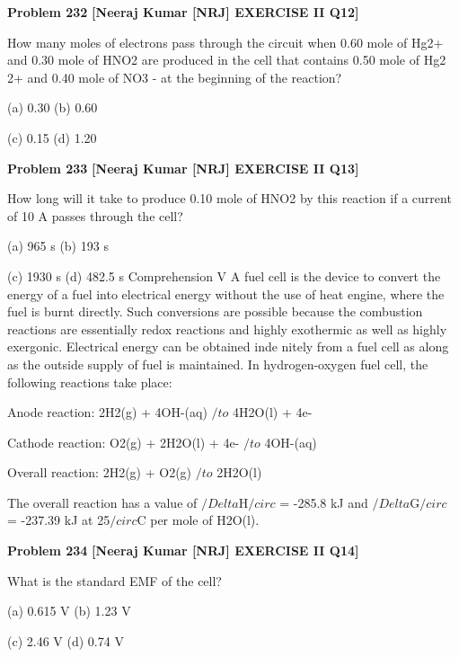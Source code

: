 \begin{problembox}
\textbf{Problem 232} \hfill \textbf{[Neeraj Kumar [NRJ] EXERCISE II Q12]}
\label{q:ext-nrj_all_questions-232}

How many moles of electrons pass through the 
circuit when 0.60 mole of Hg2+ and 0.30 mole 
of HNO2 are produced in the cell that contains 
0.50 mole of Hg2
2+ and 0.40 mole of NO3
- at the 
beginning of the reaction?
 
 (a) 0.30 
(b) 0.60
 
 (c) 0.15 
(d) 1.20
\end{problembox}

\begin{problembox}
\textbf{Problem 233} \hfill \textbf{[Neeraj Kumar [NRJ] EXERCISE II Q13]}
\label{q:ext-nrj_all_questions-233}

How long will it take to produce 0.10  mole of 
HNO2 by this reaction if a current of 10 A passes 
through the cell?
 
 (a) 965 s 
(b) 193 s
 
 (c) 1930 s 
(d) 482.5 s
Comprehension V
A fuel cell is the device to convert the energy of a fuel into electrical energy without the use of heat  engine, where the 
fuel is burnt directly. Such conversions are possible because the combustion reactions are essentially redox reactions and 
highly exothermic as well as highly exergonic. Electrical  energy can be obtained inde  nitely from a fuel cell as along as 
the outside supply of fuel is maintained. In hydrogen-oxygen fuel cell, the following reactions take place:
 
 Anode reaction: 
2H2(g) + 4OH-(aq) $/to$ 4H2O(l) + 4e-
 
 Cathode reaction: 
O2(g) + 2H2O(l) + 4e- $/to$ 4OH-(aq)
 
 Overall reaction: 
2H2(g) + O2(g) $/to$ 2H2O(l)
 
 The overall reaction has a value of $/Delta$H$/circ$ = -285.8 kJ and $/Delta$G$/circ$ = -237.39 kJ at 25$/circ$C per mole of H2O(l).
\end{problembox}

\begin{problembox}
\textbf{Problem 234} \hfill \textbf{[Neeraj Kumar [NRJ] EXERCISE II Q14]}
\label{q:ext-nrj_all_questions-234}

What is the standard EMF of the cell?
 
 (a) 0.615 V 
(b) 1.23 V
 
 (c) 2.46 V 
(d) 0.74 V
\end{problembox}

